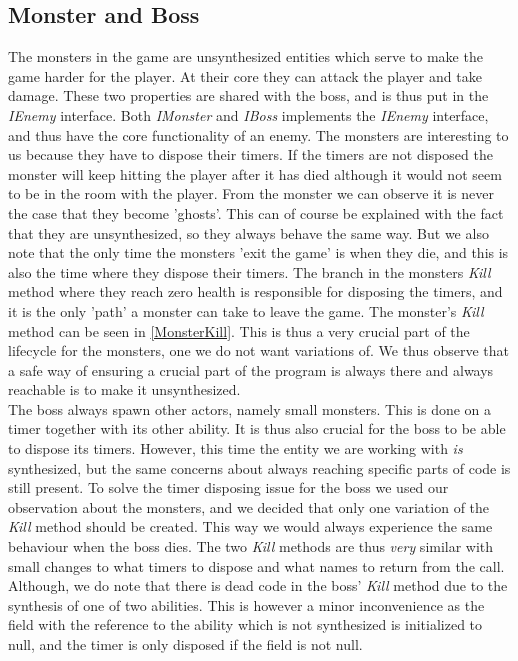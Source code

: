 \subsection{Monster and Boss}
The monsters in the game are unsynthesized entities which serve to make the game harder for the player. At their core they can attack the player and take damage. These two properties are shared with the boss, and is thus put in the \textit{IEnemy} interface. Both \textit{IMonster} and \textit{IBoss} implements the \textit{IEnemy} interface, and thus have the core functionality of an enemy. The monsters are interesting to us because they have to dispose their timers. If the timers are not disposed the monster will keep hitting the player after it has died although it would not seem to be in the room with the player. From the monster we can observe it is never the case that they become 'ghosts'. This can of course be explained with the fact that they are unsynthesized, so they always behave the same way. But we also note that the only time the monsters 'exit the game' is when they die, and this is also the time where they dispose their timers. The branch in the monsters \textit{Kill} method where they reach zero health is responsible for disposing the timers, and it is the only 'path' a monster can take to leave the game. The monster's \textit{Kill} method can be seen in \autoref{MonsterKill}. This is thus a very crucial part of the lifecycle for the monsters, one we do not want variations of. We thus observe that a safe way of ensuring a crucial part of the program is always there and always reachable is to make it unsynthesized.\\ 
The boss always spawn other actors, namely small monsters. This is done on a timer together with its other ability. It is thus also crucial for the boss to be able to dispose its timers. However, this time the entity we are working with \textit{is} synthesized, but the same concerns about always reaching specific parts of code is still present. To solve the timer disposing issue for the boss we used our observation about the monsters, and we decided that only one variation of the \textit{Kill} method should be created. This way we would always experience the same behaviour when the boss dies. The two \textit{Kill} methods are thus \textit{very} similar with small changes to what timers to dispose and what names to return from the call. Although, we do note that there is dead code in the boss' \textit{Kill} method due to the synthesis of one of two abilities. This is however a minor inconvenience as the field with the reference to the ability which is not synthesized is initialized to null, and the timer is only disposed if the field is not null.
